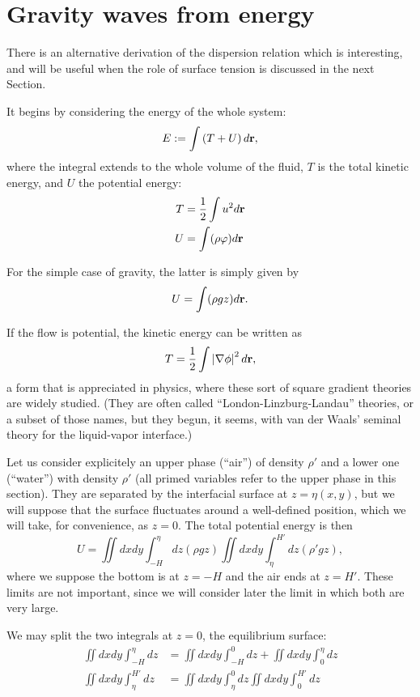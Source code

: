 \section{Gravity waves from energy}

There is an alternative derivation of the dispersion relation which is
interesting, and will be useful when the role of surface tension is
discussed in the next Section. \cite{whitham2011linear}

It begins by considering the energy of the whole system:
\[
  E := \int \left( T + U \right) d\mathbf{r} ,
\]
where the integral extends to the whole volume of the fluid, $T$ is
the total kinetic energy, and $U$ the potential energy:
\begin{align}
  T &= \frac12 \int u^2 d\mathbf{r} \\
  U &=  \int (\rho \varphi) d\mathbf{r} 
\end{align}

For the simple case of gravity, the latter is simply given by
\begin{equation}
  U =    \int ( \rho g z ) d\mathbf{r} .
\end{equation}


If the flow is potential, the kinetic energy can be written as
\begin{equation}
  T = \frac12 \int \left| \nabla\phi \right|^2 d\mathbf{r} ,
\end{equation}
a form that is appreciated in physics, where these sort of square
gradient theories are widely studied. (They are often called
``London-Linzburg-Landau'' theories, or a subset of those names, but
they begun, it seems, with van der Waals' seminal theory for the
liquid-vapor interface.)

Let us consider explicitely an upper phase (``air'') of density
$\rho'$ and a lower one (``water'') with density $\rho'$ (all primed
variables refer to the upper phase in this section). They are
separated by the interfacial surface at $z=\eta(x,y)$, but we will
suppose that the surface fluctuates around a well-defined position,
which we will take, for convenience, as $z=0$. The total potential
energy is then
\[
U=
\iint dx dy   \int_{-H}^\eta  dz  ( \rho g z)
\iint dx dy   \int_\eta^{H'}  dz  ( \rho' g z)  ,
\]
where we suppose the bottom is at $z=-H$ and the air ends at $z=H'$. These
limits are not important, since we will consider later the limit
in which both are very large.

We may split the two integrals at $z=0$, the equilibrium surface:
\begin{align*}
  \iint dx dy   \int_{-H}^\eta  dz   &= 
                                       \iint dx dy   \int_{-H}^0  dz   +
                                       \iint dx dy   \int_{0}^\eta  dz   \\
  \iint dx dy   \int_\eta^{H'}  dz    &=
                                        \iint dx dy   \int_\eta^{0}  dz 
                                        \iint dx dy   \int_0^{H'}  dz  
\end{align*}

